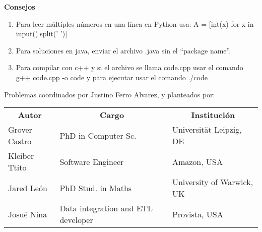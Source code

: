 \textbf{Consejos}
\begin{enumerate}
    \item Para leer múltiples números en una línea en Python usa: A = [int(x) for x in input().split(' ')]
    \item Para soluciones en java, enviar el archivo .java sin el ``package name''.
    \item Para compilar con c++ y si el archivo se llama code.cpp usar el comando g++ code.cpp -o code y para ejecutar usar el comando ./code
\end{enumerate}

\begin{center}
    \vspace{1cm}
    Problemas coordinados por Justino Ferro Alvarez, y planteados por:
    \vspace{0.3cm}
    \begin{tabular}{ l l l}
        \multicolumn{1}{c}{\textbf{Autor}} & \multicolumn{1}{c}{\textbf{Cargo}} & \multicolumn{1}{c}{\textbf{Institución}}  \\
        Grover Castro & PhD in Computer Sc. & Universität Leipzig, DE\\
        Kleiber Ttito & Software Engineer & Amazon, USA \\
        Jared León & PhD Stud. in Maths & University of Warwick, UK\\
        Josué Nina & Data integration and ETL developer & Provista, USA\\
    \end{tabular}
\end{center}

